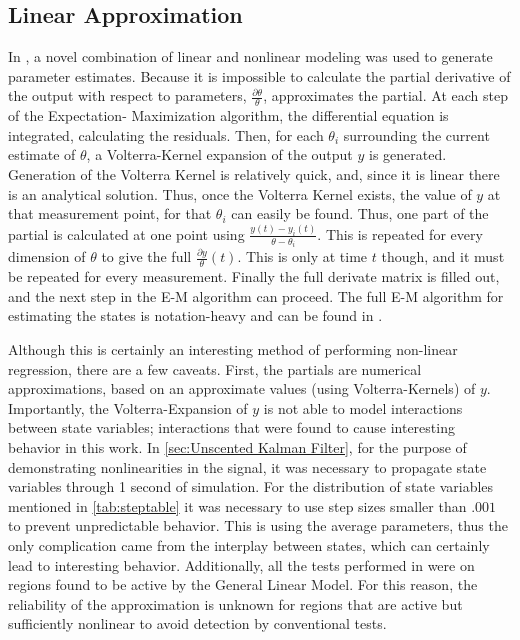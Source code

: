 \subsection{Linear Approximation}
In \cite{Friston2002b}, a novel combination of linear and nonlinear modeling
was used to generate parameter estimates. Because it is impossible to 
calculate the partial derivative of
the output with respect to parameters, $\frac{\partial \theta}{\theta}$, 
\cite{Friston2002b} approximates the partial. At each step of the Expectation-
Maximization algorithm, the differential equation is integrated, calculating
the residuals. Then, for each $\theta_i$ surrounding the current estimate of 
$\theta$, a Volterra-Kernel expansion of the output $y$ is generated. Generation
of the Volterra Kernel is relatively quick, and, since it is linear there
is an analytical solution. Thus, once the Volterra Kernel exists, the value
of $y$ at that measurement point, for that $\theta_i$ can easily be found. 
Thus, one part of the partial is calculated at one point using
$\frac{y(t) - y_i(t)}{\theta - \theta_i}$. This is repeated for
every dimension of $\theta$ to give the full $\frac{\partial y}{\theta}(t)$.
This is only at time $t$ though, and it must be repeated for every
measurement. Finally the full derivate matrix is filled out, and
the next step in the E-M algorithm can proceed. The full E-M algorithm
for estimating the states is notation-heavy and can be found in \cite{Friston2002b}.

Although this is certainly an interesting method of performing non-linear
regression, there are a few caveats. First, the partials are numerical
approximations, based on an approximate values (using Volterra-Kernels) of $y$.
Importantly, the Volterra-Expansion of $y$ is not able to model interactions
between state variables; interactions that were found to cause interesting
behavior in this work. In \autoref{sec:Unscented Kalman Filter}, for
the purpose of demonstrating nonlinearities in the signal, it was 
necessary to propagate state variables through 1 second of simulation.
For the distribution of state variables mentioned in \autoref{tab:steptable}
it was necessary to use step sizes smaller than $.001$ to prevent 
unpredictable behavior. This is using the average parameters, thus the
only complication came from the interplay between states, which can 
certainly lead to interesting behavior. Additionally, all the tests performed
in \cite{Friston2002b} were on regions found to be active by the General
Linear Model. For this reason, the reliability of the approximation is unknown
for regions that are active but
sufficiently nonlinear to avoid detection by conventional tests.

